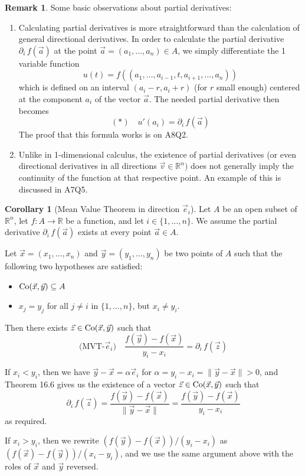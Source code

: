 \documentclass[11pt]{article}
\makeatletter
\theoremstyle{definition}
\newtheorem{cor}[thm]{Corollary}
\newtheorem{remark}[thm]{Remark}
\newcommand{\R}{\ensuremath{\mathbb{R}}}
\newenvironment{pf}[1][\proofname]{\par
  \pushQED{\qed}%
  \normalfont \topsep0\p@\relax
  \trivlist
  \item[\hskip\labelsep\itshape
  #1\@addpunct{.}]\ignorespaces
}{%
  \popQED\endtrivlist\@endpefalse
}
\makeatother
\begin{document}
\begin{remark}
Some basic observations about partial derivatives:
\vspace{-1.5ex}\begin{enumerate}[(1)]
\item Calculating partial derivatives is more straightforward than the calculation of general directional derivatives. In order to calculate the partial derivative $\partial_i\,f(\vec{a})$ at the point $\vec{a} = (a_1, \dots, a_n) \in A$, we simply differentiate the 1 variable function
$$u(t) = f((a_1, \dots, a_{i-1}, t, a_{i+1}, \dots, a_n))$$
which is defined on an interval $(a_i - r, a_i + r)$ (for $r$ small enough) centered at the component $a_i$ of the vector $\vec{a}$. The needed partial derivative then becomes
$$(*) \quad u'(a_i) = \partial_i\,f(\vec{a})$$
The proof that this formula works is on A8Q2. 
\item Unlike in 1-dimensional calculus, the existence of partial derivatives (or even directional derivatives in all directions $\vec{v} \in \R^n)$ does not generally imply the continuity of the function at that respective point. An example of this is discussed in A7Q5.
\end{enumerate}\vspace{-1.5ex}
\end{remark}

\begin{cor}[Mean Value Theorem in direction $\vec{e}_i$]
Let $A$ be an open subset of $\R^n$, let $f : A \to \R$ be a function, and let $i \in \{1, \dots, n\}$. We assume the partial derivative $\partial_i\,f(\vec{a})$ exists at every point $\vec{a} \in A$.

Let $\vec{x} = (x_1, \dots, x_n)$ and $\vec{y} = (y_1, \dots, y_n)$ be two points of $A$ such that the following two hypotheses are satisfied:
\vspace{-1.5ex}\begin{itemize}
    \item ${\rm Co}(\vec{x}, \vec{y}) \subseteq A$
    \item $x_j = y_j$ for all $j \neq i$ in $\{1, \dots, n\}$, but $x_i \neq y_i$.
\end{itemize}\vspace{-1.5ex}
Then there exists $\vec{z} \in {\rm Co}(\vec{x}, \vec{y})$ such that
$$\text{(MVT-$\vec{e}_i$)} \quad \frac{f(\vec{y}) - f(\vec{x})}{y_i - x_i} = \partial_i\,f(\vec{z})$$
\begin{pf}
If $x_i < y_i$, then we have $\vec{y} - \vec{x} = \alpha\vec{e}_i$ for $\alpha = y_i - x_i = \|\vec{y} - \vec{x}\| > 0$, and Theorem 16.6 gives us the existence of a vector $\vec{z} \in {\rm Co}(\vec{x}, \vec{y})$ such that
$$\partial_i\,f(\vec{z}) = \frac{f(\vec{y}) - f(\vec{x})}{\|\vec{y} - \vec{x}\|} = \frac{f(\vec{y}) - f(\vec{x})}{y_i - x_i}$$
as required. 

If $x_i > y_i$, then we rewrite $(f(\vec{y}) - f(\vec{x})) / (y_i - x_i)$ as $(f(\vec{x}) - f(\vec{y})) / (x_i - y_i)$, and we use the same argument above with the roles of $\vec{x}$ and $\vec{y}$ reversed.
\end{pf}
\end{cor}
\end{document}
